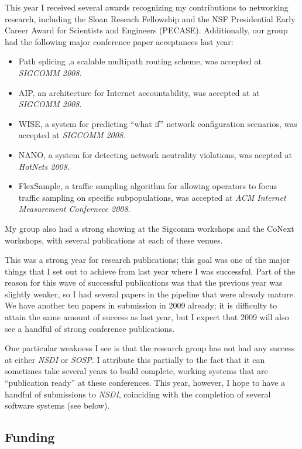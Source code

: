 \begin{sloppypar}
This year I received several awards recognizing my contributions to
networking research, including the Sloan Reseach Fellowship and the NSF
Presidential Early Career Award for Scientists and Engineers (PECASE).
Additionally, our group had the following major conference paper
acceptances last year:

\begin{itemize}
\itemsep=-1pt
\item Path splicing ,a scalable multipath routing scheme, was accepted
at {\em SIGCOMM 2008}.
\item AIP, an architecture for Internet accountability, was accepted at
at {\em SIGCOMM 2008}.
\item WISE, a system for predicting ``what if'' network configuration
scenarios, was accepted at {\em SIGCOMM 2008}.
\item NANO, a system for detecting network neutrality violations, was
acepted at {\em HotNets 2008}.
\item FlexSample, a traffic sampling algorithm for allowing operators to
focus traffic sampling on specific subpopulations, was accepted at {\em
ACM Internet Measurement Confernece 2008}.
\end{itemize}
\noindent
My group also had a strong showing at the Sigcomm workshops and the
CoNext workshops, with several publications at each of these venues.

This was a strong year for research publications; this goal was one of
the major things that I set out to achieve from last year where I was
successful.  Part of the reason for this wave of successful publications
was that the previous year was slightly weaker, so I had several papers
in the pipeline that were already mature.  We have another ten papers in
submission in 2009 already; it is difficulty to attain the same amount
of success as last year, but I expect that 2009 will also see a handful
of strong conference publications.

One particular weakness I see is that the research group has not had any
success at either {\em NSDI} or {\em SOSP}.  I attribute this partially
to the fact that it can sometimes take several years to build complete,
working systems that are ``publication ready'' at these conferences.
This year, however, I hope to have a handful of submissions to {\em
NSDI}, coinciding with the completion of several software systems (see
below).

\subsection*{Funding}


\end{sloppypar}
